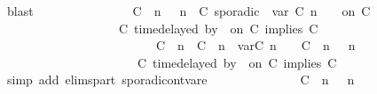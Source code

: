 \begin{isabellebody}
\ blast\isanewline
\ \ \ \ \ \ \ \ \ \ \isamarkupfalse%
\ \isamarkupfalse%
\ {\isacartoucheopen}{\isacharparenleft}\ \ {\isacharparenleft}{\isacharparenleft}C\ {\isasymUp}\ n{\isacharparenright}\ {\isacharhash}\ {\isasymGamma}{\isacharparenright}{\isacharcomma}\ n\ {\isasymturnstile}\ {\isacharparenleft}C\ sporadic{\isasymsharp}\ {\isasymlparr}\ {\isasymtau}\isactrlsub v\isactrlsub a\isactrlsub r\ {\isacharparenleft}C\ n{\isacharparenright}\ {\isasymoplus}\ {\isasymdelta}{\isasymtau}\ {\isasymrparr}\ on\ C\ {\isacharhash}\ {\isasymPsi}\isanewline
\ \ \ \ \ \ \ \ \ \ \ \ \ \ \ \ \ \ {\isasymtriangleright}\ {\isacharparenleft}{\isacharparenleft}C\ time{\isacharminus}delayed{\isasymbowtie}\ by\ {\isasymdelta}{\isasymtau}\ on\ C\ implies\ C\ {\isacharhash}\ {\isasymPhi}{\isacharparenright}{\isacharparenright}\isanewline
\ \ \ \ \ \ \ \ \ \ \ \ \ \ \ \ \ \ \ \ \ \ \ \ {\isasymhookrightarrow}\ {\isacharparenleft}{\isacharparenleft}{\isacharparenleft}C\ {\isasymUp}\ n{\isacharparenright}\ {\isacharhash}\ {\isacharparenleft}C\ {\isasymDown}\ n\ {\isacharat}{\isasymsharp}\ {\isasymlparr}{\isasymtau}\isactrlsub v\isactrlsub a\isactrlsub r{\isacharparenleft}C\ n{\isacharparenright}\ {\isasymoplus}\ {\isasymdelta}{\isasymtau}{\isasymrparr}{\isacharparenright}\ {\isacharhash}\ {\isacharparenleft}C\ {\isasymUp}\ n{\isacharparenright}\ {\isacharhash}\ {\isasymGamma}{\isacharparenright}{\isacharcomma}\ n\isanewline
\ \ \ \ \ \ \ \ \ \ \ \ \ \ \ \ \ \ \ {\isasymturnstile}\ {\isasymPsi}\ {\isasymtriangleright}\ {\isacharparenleft}{\isacharparenleft}C\ time{\isacharminus}delayed{\isasymbowtie}\ by\ {\isasymdelta}{\isasymtau}\ on\ C\ implies\ C\ {\isacharhash}\ {\isasymPhi}{\isacharparenright}{\isacharparenright}{\isacartoucheclose}\isanewline
\ \ \ \ \ \ \ \ \ \ \ \ \isamarkupfalse%
\ {\isacharparenleft}simp\ add{\isacharcolon}\ elims{\isacharunderscore}part\ sporadic{\isacharunderscore}on{\isacharunderscore}tvar{\isacharunderscore}e{}{\isacharparenright}\isanewline
\ \ \ \ \ \ \ \ \ \ \isamarkupfalse%
\ \isamarkupfalse%
\ {\isacartoucheopen}{\isacharparenleft}\ {\isacharparenleft}{\isacharparenleft}C\ {\isasymUp}\ n{\isacharparenright}\ {\isacharhash}\ {\isasymGamma}{\isacharparenright}{\isacharcomma}\ n\isanewline

\end{isabellebody}
